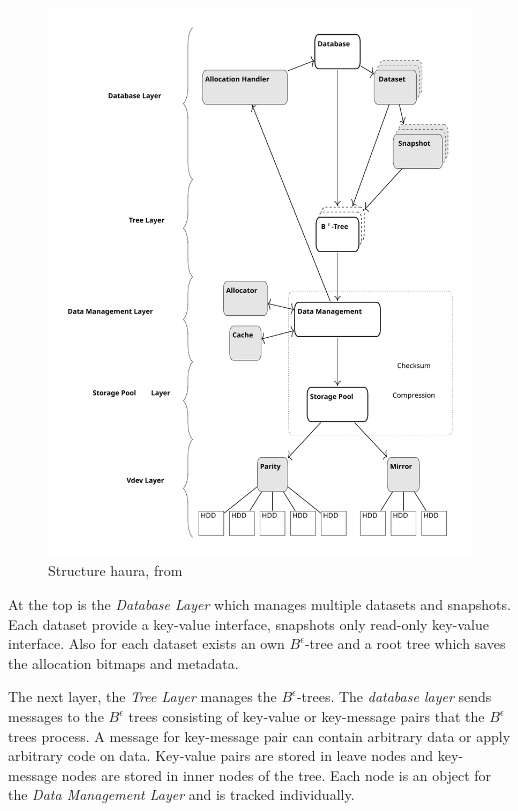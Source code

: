 \documentclass[
	12pt,
	a4paper,
	abstract,
	bibliography=totoc,
	chapterprefix,
	headings=openright,
	numbers=endperiod,
	parskip=half,
	twoside,
]{scrreprt}
\begin{document}
\begin{figure}[ht]
	\centering
	\includegraphics[scale=0.4]{overview_haura_level.pdf}
	\caption{Structure haura, from \cite{wiedemann2018modern}}
		\label{fig:structure haura}
\end{figure}


At the top is the \emph{Database Layer} which manages multiple datasets and snapshots. Each dataset provide a key-value interface, snapshots only read-only key-value interface. Also for each dataset exists an own $B^{\epsilon}$-tree and  a root tree which saves the allocation bitmaps and metadata.

The next layer, the \emph{Tree Layer} manages the $B^{\epsilon}$-trees.
The \emph{database layer} sends messages to the $B^{\epsilon}$ trees consisting of key-value or key-message pairs that the $B^{\epsilon}$ trees process. A message for key-message pair can contain arbitrary data or apply arbitrary code on data.
Key-value pairs are stored in leave nodes and key-message nodes are stored in inner nodes of the tree.
Each node is an object for the \emph{Data Management Layer} and is tracked individually.
\end{document}
